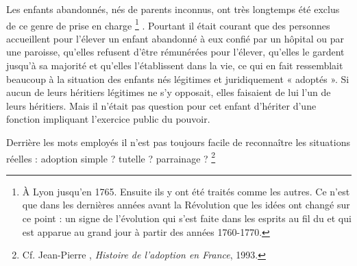  Les enfants abandonnés, nés de parents inconnus, ont très longtemps été exclus de ce genre de prise en charge%
\footnote{À Lyon jusqu'en 1765. Ensuite ils y ont été traités comme les autres. Ce n'est que dans les dernières années avant la Révolution que les idées ont changé sur ce point : un signe de l'évolution qui s'est faite dans les esprits au fil du  et qui est apparue au grand jour à partir des années 1760-1770.}%
. Pourtant il était courant que des personnes accueillent pour l'élever un enfant abandonné à eux confié par un hôpital ou par une paroisse, qu'elles refusent d'être rémunérées pour l'élever, qu'elles le gardent jusqu'à sa majorité et qu'elles l'établissent dans la vie, ce qui en fait ressemblait beaucoup à la situation des enfants nés légitimes et juridiquement « adoptés ». Si aucun de leurs héritiers légitimes ne s'y opposait, elles faisaient de lui l'un de leurs héritiers. Mais il n'était pas question pour cet enfant d'hériter d'une fonction impliquant l'exercice public du pouvoir. 

 Derrière les mots employés il n'est pas toujours facile de reconnaître les situations réelles : adoption simple ? tutelle ? parrainage ?%
\footnote{Cf. Jean-Pierre , \emph{Histoire de l'adoption en France}, 1993.} 


